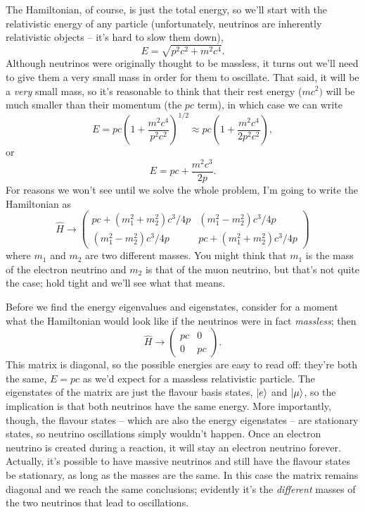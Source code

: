 The Hamiltonian, of course, is just the total energy, so we'll start with the relativistic energy of any particle (unfortunately, neutrinos are inherently relativistic objects -- it's hard to slow them down), 
\[
E = \sqrt{p^2c^2 + m^2 c^4}.
\]
Although neutrinos were originally thought to be massless, it turns out we'll need to give them a very small mass in order for them to oscillate.  That said, it will be a \emph{very} small mass, so it's reasonable to think that their rest energy ($mc^2)$ will be much smaller than their momentum (the $pc$ term), in which case we can write 
\[
E = pc \left( 1 + \frac{m^2c^4}{p^2c^2} \right)^{1/2} \approx pc \left( 1 + \frac{m^2c^4}{2p^2c^2} \right),
\]
or
\begin{equation}
\label{eq_relE}
E = pc + \frac{m^2c^3}{2p}.
\end{equation}
For reasons we won't see until we solve the whole problem, I'm going to write the Hamiltonian as
\begin{equation}
\hat{H} \to \begin{pmatrix}
pc + (m_1^2 + m_2^2) c^3/4p & (m_1^2 - m_2^2)c^3/4p \\
(m_1^2 - m_2^2)c^3/4p &pc + (m_1^2 + m_2^2) c^3/4p 
\end{pmatrix}
\end{equation}
where $m_1$ and $m_2$ are two different masses.  You might think that $m_1$ is the mass of the electron neutrino and $m_2$ is that of the muon neutrino, but that's not quite the case; hold tight and we'll see what that means.

Before we find the energy eigenvalues and eigenstates, consider for a moment what the Hamiltonian would look like if the neutrinos were in fact \emph{massless}; then
\[
\hat{H} \to \begin{pmatrix}
pc & 0 \\
0 & pc 
\end{pmatrix}.
\]
This matrix is diagonal, so the possible energies are easy to read off: they're both the same, $E = pc$ as we'd expect for a massless relativistic particle.  The eigenstates of the matrix are just the flavour basis states, $| e \rangle$ and $| \mu \rangle$, so the implication is that both neutrinos have the same energy.  More importantly, though, the flavour states -- which are also the energy eigenstates -- are stationary states, so neutrino oscillations simply wouldn't happen.  Once an electron neutrino is created during a reaction, it will stay an electron neutrino forever.  Actually, it's possible to have massive neutrinos and still have the flavour states be stationary, as long as the masses are the same.  In this case the matrix remains diagonal and we reach the same conclusions; evidently it's the \emph{different} masses of the two neutrinos that lead to oscillations.

